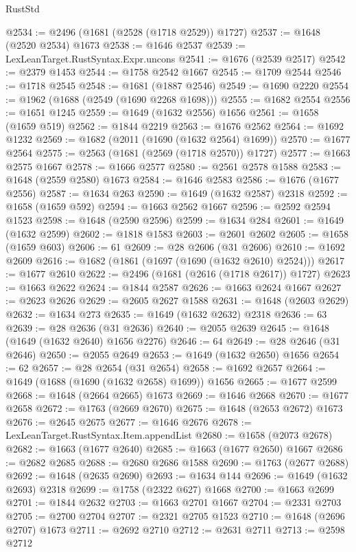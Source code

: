 \begin{lexlean}{RustStd}
\begin{coremodule}
@2534 := @2496 (@1681 (@2528 (@1718 @2529)) @1727)
@2537 := @1648 (@2520 @2534) @1673
@2538 := @1646 @2537
@2539 := LexLeanTarget.RustSyntax.Expr.uncons
@2541 := @1676 (@2539 @2517)
@2542 := @2379 @1453
@2544 := @1758 @2542 @1667
@2545 := @1709 @2544
@2546 := @1718 @2545
@2548 := @1681 (@1887 @2546)
@2549 := @1690 @2220
@2554 := @1962 (@1688 (@2549 (@1690 @2268 @1698)))
@2555 := @1682 @2554
@2556 := @1651 @1245
@2559 := @1649 (@1632 @2556) @1656
@2561 := @1658 (@1659 @519)
@2562 := @1844 @2219
@2563 := @1676 @2562
@2564 := @1692 @1232
@2569 := @1682 (@2011 (@1690 (@1632 @2564) @1699))
@2570 := @1677 @2564
@2575 := @2563 (@1681 (@2569 (@1718 @2570)) @1727)
@2577 := @1663 @2575 @1667
@2578 := @1666 @2577
@2580 := @2561 @2578 @1588
@2583 := @1648 (@2559 @2580) @1673
@2584 := @1646 @2583
@2586 := @1676 (@1677 @2556)
@2587 := @1634 @263
@2590 := @1649 (@1632 @2587) @2318
@2592 := @1658 (@1659 @592)
@2594 := @1663 @2562 @1667
@2596 := @2592 @2594 @1523
@2598 := @1648 (@2590 @2596)
@2599 := @1634 @284
@2601 := @1649 (@1632 @2599)
@2602 := @1818 @1583
@2603 := @2601 @2602
@2605 := @1658 (@1659 @603)
@2606 := 61
@2609 := @28 @2606 (@31 @2606)
@2610 := @1692 @2609
@2616 := @1682 (@1861 (@1697 (@1690 (@1632 @2610) @2524)))
@2617 := @1677 @2610
@2622 := @2496 (@1681 (@2616 (@1718 @2617)) @1727)
@2623 := @1663 @2622
@2624 := @1844 @2587
@2626 := @1663 @2624 @1667
@2627 := @2623 @2626
@2629 := @2605 @2627 @1588
@2631 := @1648 (@2603 @2629)
@2632 := @1634 @273
@2635 := @1649 (@1632 @2632) @2318
@2636 := 63
@2639 := @28 @2636 (@31 @2636)
@2640 := @2055 @2639
@2645 := @1648 (@1649 (@1632 @2640) @1656 @2276)
@2646 := 64
@2649 := @28 @2646 (@31 @2646)
@2650 := @2055 @2649
@2653 := @1649 (@1632 @2650) @1656
@2654 := 62
@2657 := @28 @2654 (@31 @2654)
@2658 := @1692 @2657
@2664 := @1649 (@1688 (@1690 (@1632 @2658) @1699)) @1656
@2665 := @1677 @2599
@2668 := @1648 (@2664 @2665) @1673
@2669 := @1646 @2668
@2670 := @1677 @2658
@2672 := @1763 (@2669 @2670)
@2675 := @1648 (@2653 @2672) @1673
@2676 := @2645 @2675
@2677 := @1646 @2676
@2678 := LexLeanTarget.RustSyntax.Item.appendList
@2680 := @1658 (@2073 @2678)
@2682 := @1663 (@1677 @2640)
@2685 := @1663 (@1677 @2650) @1667
@2686 := @2682 @2685
@2688 := @2680 @2686 @1588
@2690 := @1763 (@2677 @2688)
@2692 := @1648 (@2635 @2690)
@2693 := @1634 @144
@2696 := @1649 (@1632 @2693) @2318
@2699 := @1758 (@2322 @627) @1668
@2700 := @1663 @2699
@2701 := @1844 @2632
@2703 := @1663 @2701 @1667
@2704 := @2331 @2703
@2705 := @2700 @2704
@2707 := @2321 @2705 @1523
@2710 := @1648 (@2696 @2707) @1673
@2711 := @2692 @2710
@2712 := @2631 @2711
@2713 := @2598 @2712

\end{coremodule}
\end{lexlean}
